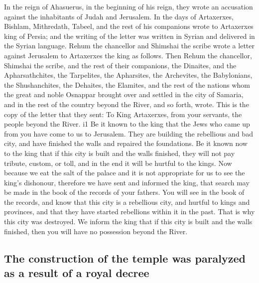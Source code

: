  In the reign of Ahasuerus, in the beginning of his reign,
they wrote an accusation against the inhabitants of Judah and Jerusalem.
 In the days of Artaxerxes, Bishlam, Mithredath, Tabeel,
and the rest of his companions wrote to Artaxerxes king of Persia; and
the writing of the letter was written in Syrian and delivered in the
Syrian language.  Rehum the chancellor and Shimshai the
scribe wrote a letter against Jerusalem to Artaxerxes the king as
follows.  Then Rehum the chancellor, Shimshai the scribe,
and the rest of their companions, the Dinaites, and the Apharsathchites,
the Tarpelites, the Apharsites, the Archevites, the Babylonians, the
Shushanchites, the Dehaites, the Elamites,  and the rest
of the nations whom the great and noble Osnappar brought over and
settled in the city of Samaria, and in the rest of the country beyond
the River, and so forth, wrote.  This is the copy of the
letter that they sent: To King Artaxerxes, from your servants, the
people beyond the River. i1  Be it known to the king that
the Jews who came up from you have come to us to Jerusalem. They are
building the rebellious and bad city, and have finished the walls and
repaired the foundations.  Be it known now to the king
that if this city is built and the walls finished, they will not pay
tribute, custom, or toll, and in the end it will be hurtful to the
kings.  Now because we eat the salt of the palace and it
is not appropriate for us to see the king's dishonour, therefore we have
sent and informed the king,  that search may be made in
the book of the records of your fathers. You will see in the book of the
records, and know that this city is a rebellious city, and hurtful to
kings and provinces, and that they have started rebellions within it in
the past. That is why this city was destroyed.  We inform
the king that if this city is built and the walls finished, then you
will have no possession beyond the River.

\hypertarget{the-construction-of-the-temple-was-paralyzed-as-a-result-of-a-royal-decree}{%
\subsection{The construction of the temple was paralyzed as a result of
a royal
decree}\label{the-construction-of-the-temple-was-paralyzed-as-a-result-of-a-royal-decree}}

